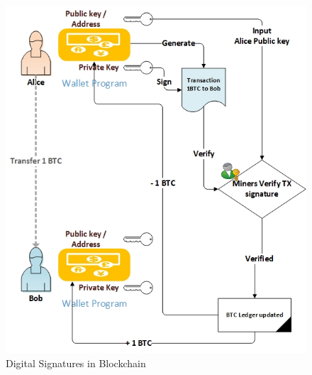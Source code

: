 \begin{figure}[h]
	\centering
    \includegraphics[width=120mm,scale=1]{figs/sig}
	\caption{Digital Signatures in Blockchain}
	\label{fig:bc-sig}
\end{figure}
\clearpage

